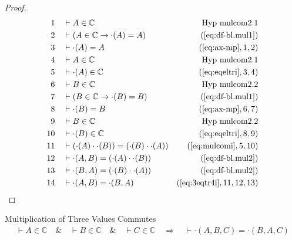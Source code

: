 \begin{proof}
\begin{align}
  1 &&  & \vdash A \in \mathbb{C}&\text{Hyp~mulcom2.1}\notag%
  \\ 2 &&  & \vdash ( A \in \mathbb{C} \rightarrow \cdot( A ) = A
     )&(\mbox{\ref{eq:df-bl.mul1}})\notag
  \\ 3 &&  & \vdash \cdot( A ) = A&(\mbox{\ref{eq:ax-mp}},1,2)\notag
  \\ 4 &&  & \vdash A \in \mathbb{C}&\text{Hyp~mulcom2.1}\notag%
  \\ 5 &&  & \vdash \cdot( A ) \in
     \mathbb{C}&(\mbox{\ref{eq:eqeltri}},3,4)\notag
  \\ 6 &&  & \vdash B \in \mathbb{C}&\text{Hyp~mulcom2.2}\notag%
  \\ 7 &&  & \vdash ( B \in \mathbb{C} \rightarrow \cdot( B ) = B
     )&(\mbox{\ref{eq:df-bl.mul1}})\notag
  \\ 8 &&  & \vdash \cdot( B ) = B&(\mbox{\ref{eq:ax-mp}},6,7)\notag
  \\ 9 &&  & \vdash B \in \mathbb{C}&\text{Hyp~mulcom2.2}\notag%
  \\ 10 &&  & \vdash \cdot( B ) \in
     \mathbb{C}&(\mbox{\ref{eq:eqeltri}},8,9)\notag
  \\ 11 &&  & \vdash ( \cdot( A ) \cdot \cdot( B ) ) = ( \cdot( B ) \cdot
     \cdot( A ) )&(\mbox{\ref{eq:mulcomi}},5,10)\notag
  \\ 12 &&  & \vdash \cdot( A , B ) = ( \cdot( A ) \cdot \cdot( B )
     )&(\mbox{\ref{eq:df-bl.mul2}})\notag
  \\ 13 &&  & \vdash \cdot( B , A ) = ( \cdot( B ) \cdot \cdot( A )
     )&(\mbox{\ref{eq:df-bl.mul2}})\notag
  \\ 14 &&  & \vdash \cdot( A , B ) = \cdot( B , A
     )&(\mbox{\ref{eq:3eqtr4i}},11,12,13)\notag
\end{align}
\end{proof}

\begin{lemma} {Multiplication of Three Values
Commutes}
\begin{align}
\vdash A \in \mathbb{C}\quad\&\quad \vdash B \in \mathbb{C}\quad\&\quad \vdash
    C \in \mathbb{C}\quad\Rightarrow\quad \vdash \cdot( A , B , C ) = \cdot( B
    , A , C )\label{eq:bl.mulcom3bac}\tag{bl.mulcom3bac}
\end{align}
\end{lemma}



